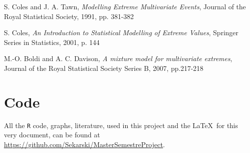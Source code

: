 \documentclass[10pt]{report}
\begin{document}
\begin{thebibliography}{9}

S. Coles and J. A. Tawn, \textit{Modelling Extreme Multivariate Events}, Journal of the Royal Statistical Society, 1991, pp. 381-382

S. Coles, \textit{An Introduction to Statistical Modelling of Extreme Values}, Springer Series in Statistics, 2001, p. 144


M.-O. Boldi and A. C. Davison, \textit{A mixture model for multivariate extremes}, Journal of the Royal Statistical Society Series B,  2007, pp.217-218

\end{thebibliography}


\chapter*{Code}
All the \texttt{R} code, graphs, literature, used in this project and the \LaTeX\ for this very document, can be found at \url{https://github.com/Sekarski/MasterSemestreProject}.


\end{document}
